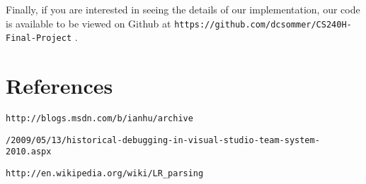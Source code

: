 \documentclass[letterpaper, 10pt]{article}
\newcommand{\ttt}{\texttt}
\begin{document}
Finally, if you are interested in seeing the details of our
implementation, our code is available to be viewed on Github at
\ttt{https://github.com/dcsommer/CS240H-Final-Project} .

\section{References}
\begin{enumerate}[{[}1{]}]

\item
\ttt{http://blogs.msdn.com/b/ianhu/archive}

\ttt{/2009/05/13/historical-debugging-in-visual-studio-team-system-2010.aspx}

\item
\ttt{http://en.wikipedia.org/wiki/LR\_parsing}

\item

\end{enumerate}
\end{document}
